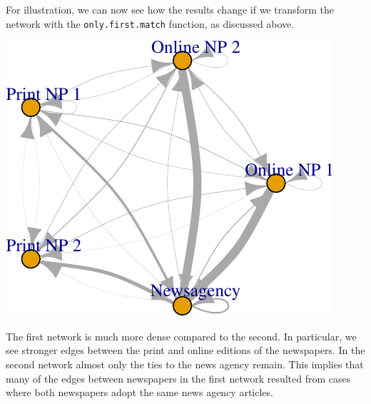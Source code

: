 \documentclass[]{article}
\newenvironment{Shaded}{\begin{snugshade}}{\end{snugshade}}
\newcommand{\KeywordTok}[1]{\textcolor[rgb]{0.13,0.29,0.53}{\textbf{{#1}}}}
\newcommand{\DataTypeTok}[1]{\textcolor[rgb]{0.13,0.29,0.53}{{#1}}}
\newcommand{\DecValTok}[1]{\textcolor[rgb]{0.00,0.00,0.81}{{#1}}}
\newcommand{\FloatTok}[1]{\textcolor[rgb]{0.00,0.00,0.81}{{#1}}}
\newcommand{\StringTok}[1]{\textcolor[rgb]{0.31,0.60,0.02}{{#1}}}
\newcommand{\NormalTok}[1]{{#1}}
\begin{document}
For illustration, we can now see how the results change if we transform
the network with the \texttt{only.first.match} function, as discussed
above.

\begin{Shaded}
\end{Shaded}

\begin{center}\includegraphics{vignette_files/figure-latex/unnamed-chunk-21-1} \end{center}

The first network is much more dense compared to the second. In
particular, we see stronger edges between the print and online editions
of the newspapers. In the second network almost only the ties to the
news agency remain. This implies that many of the edges between
newspapers in the first network resulted from cases where both
newspapers adopt the same news agency articles.
\end{document}
